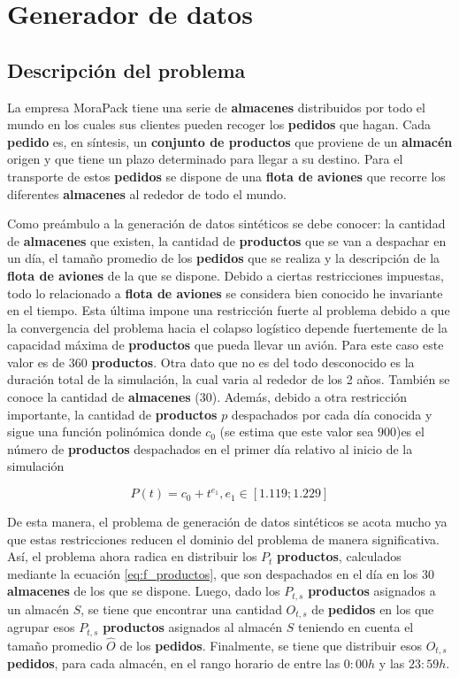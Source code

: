 \chapter{Generador de datos} \label{ch:data-generator}

\section{Descripción del problema}
La empresa MoraPack tiene una serie de \textbf{almacenes} distribuidos por todo el mundo en los cuales sus clientes pueden recoger los \textbf{pedidos} que hagan. Cada \textbf{pedido} es, en síntesis, un \textbf{conjunto de productos} que proviene de un \textbf{almacén} origen y que tiene un plazo determinado para llegar a su destino. Para el transporte de estos \textbf{pedidos} se dispone de una \textbf{flota de aviones} que recorre los diferentes \textbf{almacenes} al rededor de todo el mundo.

Como preámbulo a la generación de datos sintéticos se debe conocer: la cantidad de \textbf{almacenes} que existen, la cantidad de \textbf{productos} que se van a despachar en un día, el tamaño promedio de los \textbf{pedidos} que se realiza y la descripción de la \textbf{flota de aviones} de la que se dispone. Debido a ciertas restricciones impuestas, todo lo relacionado a \textbf{flota de aviones} se considera bien conocido he invariante en el tiempo. Esta última impone una restricción fuerte al problema debido a que la convergencia del problema hacia el colapso logístico depende fuertemente de la capacidad máxima de \textbf{productos} que pueda llevar un avión. Para este caso este valor es de $360$ \textbf{productos}. Otra dato que no es del todo desconocido es la duración total de la simulación, la cual varia al rededor de los 2 años. También se conoce la cantidad de \textbf{almacenes} ($30$). Además, debido a otra restricción importante,  la cantidad de \textbf{productos} $p$ despachados por cada día conocida y sigue una función polinómica donde $c_0$ (se estima que este valor sea $900$)es el número de \textbf{productos} despachados en el primer día relativo al inicio de la simulación

\begin{equation}
    \label{eq:f_productos}
    P(t) = c_0 + t^{e_1}, e_1 \in [1.119;  1.229]
\end{equation}

De esta manera, el problema de generación de datos sintéticos se acota mucho ya que estas restricciones reducen el dominio del problema de manera significativa. Así, el problema ahora radica en distribuir los $P_t$ \textbf{productos}, calculados mediante la ecuación \ref{eq:f_productos}, que son despachados en el día en los 30 \textbf{almacenes} de los que se dispone. Luego, dado los $P_{t,s}$ \textbf{productos} asignados a un almacén $S$, se tiene que encontrar una cantidad $O_{t,s}$ de \textbf{pedidos} en los que agrupar esos $P_{t,s}$ \textbf{productos} asignados al almacén $S$ teniendo en cuenta el tamaño promedio $\widehat{O}$ de los \textbf{pedidos}. Finalmente, se tiene que distribuir esos $O_{t,s}$ \textbf{pedidos}, para cada almacén, en el rango horario de entre las $0:00h$ y las $23:59h$.

